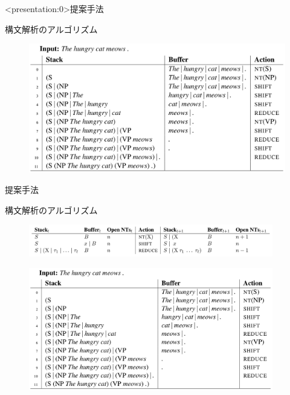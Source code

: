 \documentclass[aspectratio=43,unicode,10pt]{beamer}
\begin{document}
\begin{frame}<presentation:0>{提案手法}
  \begin{block}{構文解析のアルゴリズム}
    \begin{figure}
      \includegraphics[width=\textwidth]{fig/fig_2.png}
    \end{figure}
  \end{block}
\end{frame}

\begin{frame}{提案手法}
  \begin{block}{構文解析のアルゴリズム}
    \begin{figure}
      \includegraphics[width=0.95\textwidth]{fig/fig_1.png}
    \end{figure}
    \vspace{-1.75ex} %
    \begin{figure}
      \includegraphics[width=0.95\textwidth]{fig/fig_2.png}
    \end{figure}
  \end{block}
\end{frame}
\end{document}
